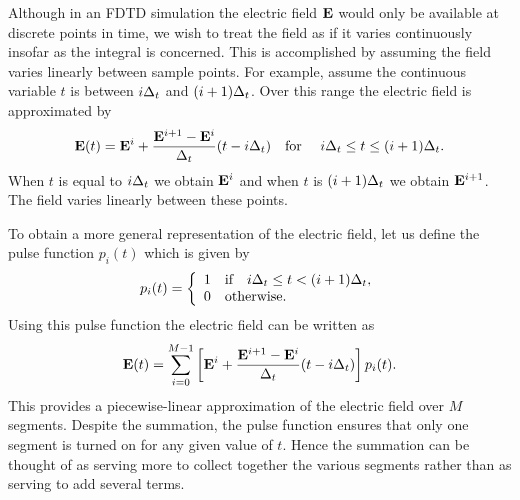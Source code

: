 Although in an FDTD simulation the electric field $\mathbf{E}$ would only
be available at discrete points in time, we wish to treat the field as
if it varies continuously insofar as the integral is concerned.
This is accomplished by assuming the field varies linearly between
sample points.  For example, assume the continuous variable $t$ is
between $i\Delta_t$ and $(i+1)\Delta_t$.  Over this range the electric field
is approximated by
\begin{equation}
  \mathbf{E}(t) = \mathbf{E}^i + \frac{\mathbf{E}^{i+1} - \mathbf{E}^{i}}{\Delta_t}(t-i\Delta_t)
  \quad \mbox{for }\quad  i\Delta_t\leq t\leq (i+1)\Delta_t.
\end{equation}
When $t$ is equal to $i\Delta_t$ we obtain $\mathbf{E}^i$ and when 
$t$ is $(i+1)\Delta_t$ we obtain $\mathbf{E}^{i+1}$.  The field varies
linearly between these points.

To obtain a more general representation of the electric field, let us
define the pulse function $p_i(t)$ which is given by
\begin{equation}
  p_i(t) = \left\{
  \begin{array}{l}
    1\quad \mbox{if} \quad i\Delta_t\leq t < (i+1)\Delta_t,\\
    0\quad \mbox{otherwise}.
  \end{array}\right.
\end{equation}
Using this pulse function the electric field can be written as
\begin{equation}
  \mathbf{E}(t) = \sum_{i=0}^{M-1}
    \left[\mathbf{E}^i +
          \frac{\mathbf{E}^{i+1} - \mathbf{E}^{i}}{\Delta_t}(t-i\Delta_t)\right] p_i(t).
\end{equation}
This provides a piecewise-linear approximation of the electric field
over $M$ segments.  Despite the summation, the pulse function ensures
that only one segment is turned on for any given value of $t$.  Hence
the summation can be thought of as serving more to collect together
the various segments rather than as serving to add several terms.

